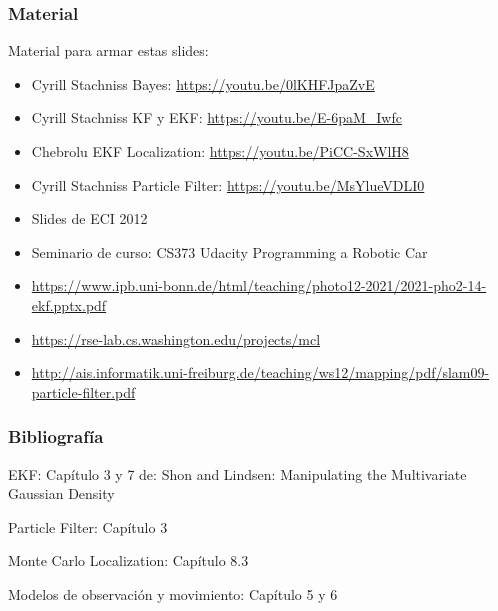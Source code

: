 \begin{frame}
    \frametitle{Material}
    
    Material para armar estas slides:
    \begin{itemize}
        \item Cyrill Stachniss Bayes: \url{https://youtu.be/0lKHFJpaZvE} 
        \item Cyrill Stachniss KF y EKF: \url{https://youtu.be/E-6paM_Iwfc}
        \item Chebrolu EKF Localization: \url{https://youtu.be/PiCC-SxWlH8}
        \item Cyrill Stachniss Particle Filter: \url{https://youtu.be/MsYlueVDLI0}
        \item Slides de ECI 2012
        \item Seminario de curso: CS373 Udacity Programming a Robotic Car
        \item \url{https://www.ipb.uni-bonn.de/html/teaching/photo12-2021/2021-pho2-14-ekf.pptx.pdf}
        \item \url{https://rse-lab.cs.washington.edu/projects/mcl}
        \item \url{http://ais.informatik.uni-freiburg.de/teaching/ws12/mapping/pdf/slam09-particle-filter.pdf}
    \end{itemize}
    
\end{frame}

\begin{frame}
	\frametitle{Bibliografía}
	
	EKF:
    Capítulo 3 y 7 de: \cite{thrun2005probabilistic}
	Shon and Lindsen: Manipulating the Multivariate Gaussian Density

    Particle Filter:
    Capítulo 3 \cite{thrun2005probabilistic}

    Monte Carlo Localization:
    Capítulo 8.3 \cite{thrun2005probabilistic}

    Modelos de observación y movimiento:
    Capítulo 5 y 6 \cite{thrun2005probabilistic}
	
	\printbibliography
	
\end{frame}